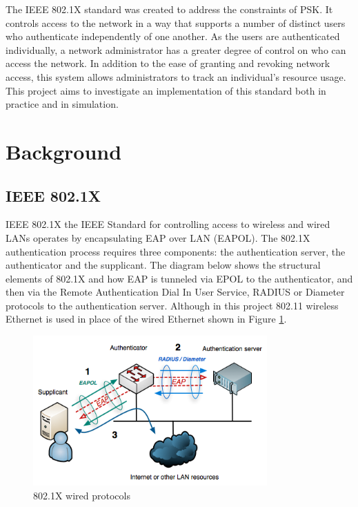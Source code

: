 \documentclass[pdftex, 12pt, a4paper]{article}
\begin{document}
The IEEE 802.1X standard was created to address the constraints of PSK. It controls access to the network in a way that supports a number of distinct users who authenticate independently of one another. As the users are authenticated individually, a network administrator has a greater degree of control on who can access the network. In addition to the ease of granting and revoking network access, this system allows administrators to track an individual's resource usage.  This project aims to investigate an implementation of this standard both in practice and in simulation.

\section{Background}
\subsection{IEEE 802.1X}
IEEE 802.1X the IEEE Standard for controlling access to wireless and wired LANs operates by encapsulating EAP over LAN (EAPOL).  The 802.1X authentication process requires three components: the authentication server, the authenticator and the supplicant.  The diagram below shows the structural elements of 802.1X and how EAP is tunneled via EPOL to the authenticator, and then via the Remote Authentication Dial In User Service, RADIUS or Diameter protocols to the authentication server. Although in this project 802.11 wireless Ethernet is used in place of the wired Ethernet shown in Figure \ref{fig:img-1}.

\begin{figure}[htb]
\centering
\includegraphics[width=0.8\textwidth]{img/8021X.png}
\caption{802.1X wired protocols \protect\cite{8021X-diag}}
\label{fig:img-1}
\end{figure}
\end{document}
